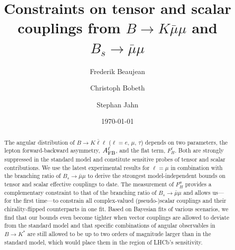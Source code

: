 \documentclass[twocolumn,epjc3]{svjour3}
\numberwithin{equation}{section}
\renewcommand{\[}{\big[}
\renewcommand{\]}{\big]}
\renewcommand{\(}{\big(}
\renewcommand{\)}{\big)}
\begin{document}
\sloppy

\title{Constraints on tensor and scalar couplings from
  $B\to K\bar\mu\mu$ and $B_s\to \bar\mu\mu$
}
\author{Frederik Beaujean
  \and
  Christoph Bobeth
  \and
  Stephan Jahn
}


\date{\today}
\maketitle

\begin{abstract}
  The angular distribution of $B\to K\bar\ell\ell$ ($\ell =
  e,\,\mu,\,\tau$) depends on two parameters, the lepton
  forward-backward asymmetry, $A_{\rm FB}^\ell$, and the flat term,
  $F_H^\ell$. Both are strongly suppressed in the standard model and
  constitute sensitive probes of tensor and scalar contributions. We
  use the latest experimental results for $\ell = \mu$ in combination
  with the branching ratio of $B_s\to \bar\mu\mu$ to derive the
  strongest model-independent bounds on tensor and scalar effective
  couplings to date. The measurement of $F_H^\mu$ provides a
  complementary constraint to that of the branching ratio of $B_s\to
  \bar\mu\mu$ and allows us---for the first time---to constrain all
  complex-valued (pseudo-)scalar couplings and their chirality-flipped
  counterparts in one fit. Based on Bayesian fits of various
  scenarios, we find that our bounds even become tighter when vector
  couplings are allowed to deviate from the standard model and that
  specific combinations of angular observables in $B \to K^*$ are
  still allowed to be up to two orders of magnitude larger than in the
  standard model, which would place them in the region of LHCb's
  sensitivity.
\end{abstract}
\end{document}
